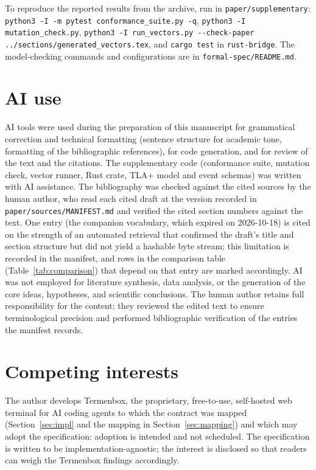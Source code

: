 To reproduce the reported results from the archive, run in
\texttt{paper/supplementary}: \texttt{python3 -I -m pytest
conformance\_suite.py -q}, \texttt{python3 -I mutation\_check.py},
\texttt{python3 -I run\_vectors.py -{}-check-paper
../sections/generated\_vectors.tex}, and \texttt{cargo test} in
\texttt{rust-bridge}. The model-checking commands and configurations
are in \texttt{formal-spec/README.md}.

\section*{AI use}

AI tools were used during the preparation of this manuscript for
grammatical correction and technical formatting (sentence structure for
academic tone, formatting of the bibliographic references), for code
generation, and for review of the text and the citations. The
supplementary code (conformance suite, mutation check, vector runner,
Rust crate, TLA+ model and event schemas) was written with AI
assistance. The bibliography was checked against the cited sources by
the human author, who read each cited draft at the version recorded in
\texttt{paper/sources/MANIFEST.md} and verified the cited section
numbers against the text. One entry (the companion
\cite{I-D.hood-agtp-standard-methods} vocabulary, which expired on
2026-10-18) is cited on the strength of an automated retrieval that
confirmed the draft's title and section structure but did not yield a
hashable byte stream; this limitation is recorded in the manifest, and
rows in the comparison table (Table~\ref{tab:comparison}) that depend
on that entry are marked accordingly. AI was not employed for
literature synthesis, data analysis, or the generation of the core
ideas, hypotheses, and scientific conclusions. The human author
retains full responsibility for the content; they reviewed the edited
text to ensure terminological precision and performed bibliographic
verification of the entries the manifest records.

\section*{Competing interests}

The author develops Termenbox, the proprietary, free-to-use, self-hosted web terminal for
AI coding agents to which the contract was mapped (Section~\ref{sec:impl}
and the mapping in Section~\ref{sec:mapping}) and which may adopt the
specification: adoption is intended and not scheduled. The specification is written to be implementation-agnostic;
the interest is disclosed so that readers can weigh the Termenbox findings
accordingly.
